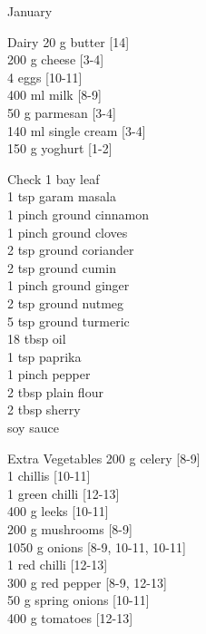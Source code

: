 \begin{menu}{January}
      \begin{shoppinglist}{Dairy}
      20 g butter {\scriptsize[14]}\\
      200 g cheese {\scriptsize[3-4]}\\
      4  eggs {\scriptsize[10-11]}\\
      400 ml milk {\scriptsize[8-9]}\\
      50 g parmesan {\scriptsize[3-4]}\\
      140 ml single cream {\scriptsize[3-4]}\\
      150 g yoghurt {\scriptsize[1-2]}\\
      \end{shoppinglist}%
      \par\vfil %
      \vfil\clearpage %
      \begin{shoppinglist}{Check}
      1  bay leaf \\
      1 tsp garam masala \\
      1 pinch ground cinnamon \\
      1 pinch ground cloves \\
      2 tsp ground coriander \\
      2 tsp ground cumin \\
      1 pinch ground ginger \\
      2 tsp ground nutmeg \\
      5 tsp ground turmeric \\
      18 tbsp oil \\
      1 tsp paprika \\
      1 pinch pepper \\
      2 tbsp plain flour \\
      2 tbsp sherry \\
       soy sauce \\
      \end{shoppinglist}%
      \begin{shoppinglist}{Extra Vegetables}
      200 g celery {\scriptsize[8-9]}\\
      1  chillis {\scriptsize[10-11]}\\
      1  green chilli {\scriptsize[12-13]}\\
      400 g leeks {\scriptsize[10-11]}\\
      200 g mushrooms {\scriptsize[8-9]}\\
      1050 g onions {\scriptsize[8-9, 10-11, 10-11]}\\
      1  red chilli {\scriptsize[12-13]}\\
      300 g red pepper {\scriptsize[8-9, 12-13]}\\
      50 g spring onions {\scriptsize[10-11]}\\
      400 g tomatoes {\scriptsize[12-13]}\\
      \end{shoppinglist}%
      \par\vfil %
    \vfil\clearpage
  

\end{menu}
